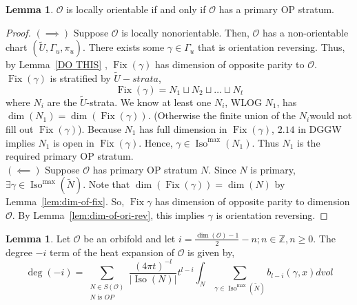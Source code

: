 \documentclass[12pt]{article}
\newcommand{\myabs}[1]{\vert#1\vert}
\theoremstyle{definition}
\newtheorem{lemma}[theorem]{Lemma}
\DeclareMathOperator{\iso}{Iso}
\DeclareMathOperator{\fix}{Fix}
\newcommand{\orb}{\mathcal O}
\begin{document}
\begin{lemma}
    $\orb$ is locally orientable if and only if $\orb$ has a primary OP stratum.
\end{lemma}
\begin{proof}
 $(\implies)$ Suppose $\orb$ is locally nonorientable. Then, $\orb$ has a non-orientable chart $(\tilde{U},\Gamma_u,\pi_u)$. There exists some $\gamma \in \Gamma_u$ that is orientation reversing. Thus, by Lemma~\ref{DO THIS} , $\fix(\gamma)$ has dimension of opposite parity to $\orb$.  $\fix(\gamma)$ is stratified by $\tilde{U}-strata$,
$$\fix(\gamma)=N_1 \sqcup N_2 \sqcup \dots \sqcup N_t$$
where $N_i$ are the $\tilde{U}$-strata. We know at least one $N_i$, WLOG $N_1$, has $\dim(N_1) = \dim(\fix(\gamma))$. (Otherwise the finite union of the $N_i$would not fill out $\fix(\gamma)$). Because $N_1$ has full dimension in $\fix(\gamma)$, $2.14$ in DGGW implies $N_1$ is open in $\fix(\gamma)$. Hence, $\gamma \in \iso^{\max}(N_1)$. Thus $N_1$ is the required primary OP stratum.\\

$(\impliedby)$ Suppose $\orb$ has primary OP stratum $N$. Since $N$ is primary, $\exists \gamma \in \iso^{\max}(\tilde{N})$. Note that $\dim(\fix(\gamma))= \dim(N)$ by Lemma~\ref{lem:dim-of-fix}. So, $\fix{\gamma}$ has dimension of opposite parity to dimension $\orb$. By Lemma~\ref{lem:dim-of-ori-rev}, this implies $\gamma$ is orientation reversing.
\end{proof}

\begin{lemma} \label{lem:deg-i}
Let $\orb$ be an orbifold and let $i = \frac{\dim(\mathcal{O})-1}{2}-n ; n \in \mathbb{Z}, n \geq 0$. The degree $-i$ term of the heat expansion of $\orb$ is given by,
    \begin{equation*}
        \deg(-i)=\sum_{\substack{N \in S(\orb) \\ N \text{ is } OP}}
        \frac{{(4\pi t)}^{-l}}{\myabs{\iso(N)}} t^{l-i} 
        \int_N \sum_{\gamma \in \iso^{\max}(\tilde{N})} 
        b_{l-i}(\gamma,x)dvol
    \end{equation*}
\end{lemma}
\end{document}
